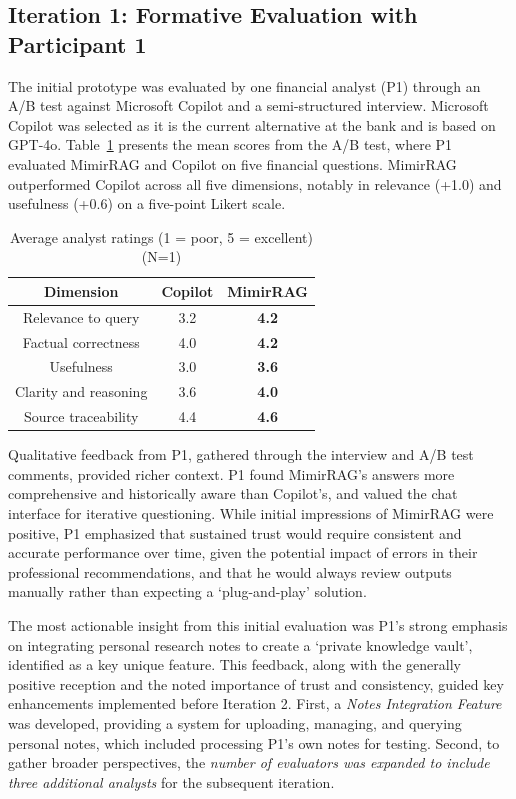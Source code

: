 \documentclass[final,5p,times,twopage,twocolumn,a4paper]{elsarticle}
\begin{document}
\subsection{Iteration 1: Formative Evaluation with Participant 1}
The initial prototype was evaluated by one financial analyst (P1) through an A/B test against Microsoft Copilot and a semi-structured interview. Microsoft Copilot was selected as it is the current alternative at the bank and is based on GPT-4o.
Table~\ref{tab:ab_means} presents the mean scores from the A/B test, where P1 evaluated MimirRAG and Copilot on five financial questions. MimirRAG outperformed Copilot across all five dimensions, notably in relevance (+1.0) and usefulness (+0.6) on a five-point Likert scale.
%
\begin{table}[!hbt]
\centering
\caption{Average analyst ratings (1 = poor, 5 = excellent) (N=1)}
\label{tab:ab_means}
\begin{tabular}{|c|c|c|}
\hline
\textbf{Dimension}    & \textbf{Copilot} & \textbf{MimirRAG} \\ \hline
Relevance to query    & 3.2              & \textbf{4.2}      \\ \hline
Factual correctness   & 4.0              & \textbf{4.2}      \\ \hline
Usefulness            & 3.0              & \textbf{3.6}      \\ \hline
Clarity and reasoning & 3.6              & \textbf{4.0}      \\ \hline
Source traceability   & 4.4              & \textbf{4.6}      \\ \hline
\end{tabular}
\end{table}
%
Qualitative feedback from P1, gathered through the interview and A/B test comments, provided richer context. P1 found MimirRAG's answers more comprehensive and historically aware than Copilot's, and valued the chat interface for iterative questioning. While initial impressions of MimirRAG were positive, P1 emphasized that sustained trust would require consistent and accurate performance over time, given the potential impact of errors in their professional recommendations, and that he would always review outputs manually rather than expecting a `plug-and-play' solution.

The most actionable insight from this initial evaluation was P1's strong emphasis on integrating personal research notes to create a `private knowledge vault', identified as a key unique feature. This feedback, along with the generally positive reception and the noted importance of trust and consistency, guided key enhancements implemented before Iteration 2. First, a \textit{Notes Integration Feature} was developed, providing a system for uploading, managing, and querying personal notes, which included processing P1's own notes for testing. Second, to gather broader perspectives, the \textit{number of evaluators was expanded to include three additional analysts} for the subsequent iteration.
\end{document}
